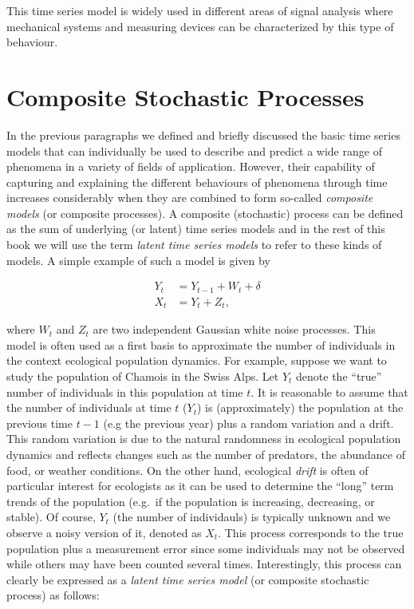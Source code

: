 \documentclass[]{book}
\theoremstyle{definition}
\theoremstyle{definition}
\theoremstyle{definition}
\theoremstyle{remark}
\begin{document}
This time series model is widely used in different areas of signal
analysis where mechanical systems and measuring devices can be
characterized by this type of behaviour.

\hypertarget{lts}{%
\section{Composite Stochastic Processes}\label{lts}}

In the previous paragraphs we defined and briefly discussed the basic
time series models that can individually be used to describe and predict
a wide range of phenomena in a variety of fields of application.
However, their capability of capturing and explaining the different
behaviours of phenomena through time increases considerably when they
are combined to form so-called \emph{composite models} (or composite
processes). A composite (stochastic) process can be defined as the sum
of underlying (or latent) time series models and in the rest of this
book we will use the term \emph{latent time series models} to refer to
these kinds of models. A simple example of such a model is given by

\[\begin{aligned}
Y_t &= Y_{t-1} + W_t + \delta\\
X_t &= Y_t + Z_t,
\end{aligned}\]

where \(W_t\) and \(Z_t\) are two independent Gaussian white noise
processes. This model is often used as a first basis to approximate the
number of individuals in the context ecological population dynamics. For
example, suppose we want to study the population of Chamois in the Swiss
Alps. Let \(Y_t\) denote the ``true'' number of individuals in this
population at time \(t\). It is reasonable to assume that the number of
individuals at time \(t\) (\(Y_t\)) is (approximately) the population at
the previous time \(t-1\) (e.g the previous year) plus a random
variation and a drift. This random variation is due to the natural
randomness in ecological population dynamics and reflects changes such
as the number of predators, the abundance of food, or weather
conditions. On the other hand, ecological \emph{drift} is often of
particular interest for ecologists as it can be used to determine the
``long'' term trends of the population (e.g.~if the population is
increasing, decreasing, or stable). Of course, \(Y_t\) (the number of
individauls) is typically unknown and we observe a noisy version of it,
denoted as \(X_t\). This process corresponds to the true population plus
a measurement error since some individuals may not be observed while
others may have been counted several times. Interestingly, this process
can clearly be expressed as a \emph{latent time series model} (or
composite stochastic process) as follows:
\end{document}
